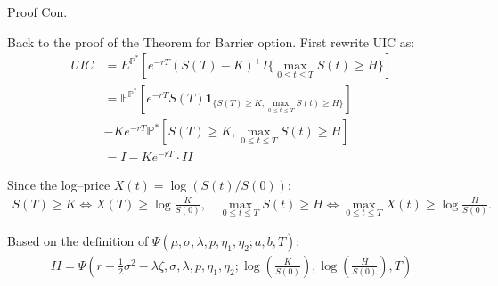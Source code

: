 \documentclass{beamer}
\begin{document}
\begin{frame}{Proof Con.}

    
    {\footnotesize \footnotesize
    \par Back to the proof of the Theorem for Barrier option. First rewrite UIC as:
    {\footnotesize \tiny
    \begin{align*}
        UIC & = E^{\mathbb{P}^*}[e^{-rT}(S(T) - K)^+I{\{ \max\limits_{0 \leq t \leq T} S(t) \geq H \}}]\\
        &= \mathbb{E}^{\mathbb{P}^*} \left[ e^{-rT} S(T) \mathbf{1}_{\{S(T) \geq K, \max_{0 \leq t \leq T} S(t) \geq H\}} \right]\\
        &- Ke^{-rT} \mathbb{P}^* \left[ S(T) \geq K, \max_{0 \leq t \leq T} S(t) \geq H \right]\\
        &= I - Ke^{-rT} \cdot II 
    \end{align*}
    }
    \par  \pause Since the log–price \( X(t) = \log(S(t)/S(0)) \):
    {\footnotesize \tiny
    \begin{align*}
        S(T) \geq K \iff X(T) \geq \log \frac{K}{S(0)},
        \quad \max_{0 \leq t \leq T} S(t) \geq H \iff \max_{0 \leq t \leq T} X(t) \geq \log \frac{H}{S(0)}.
    \end{align*}
    }
    \par Based on the definition of $\Psi(\mu, \sigma, \lambda, p, \eta_1, \eta_2; a, b, T)$:
    {\footnotesize \tiny
    \begin{align*}
        II = \Psi \left( r - \frac{1}{2} \sigma^2 - \lambda \zeta, \sigma, \lambda, p, \eta_1, \eta_2; \log \left( \frac{K}{S(0)} \right), \log \left( \frac{H}{S(0)} \right), T \right)
    \end{align*}
    }
    }
    
\end{frame}
\end{document}
